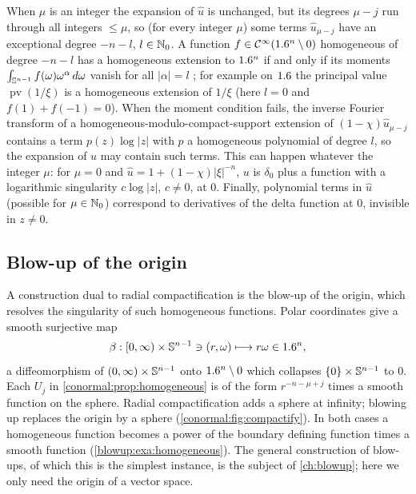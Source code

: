 When $\mu$ is an integer the expansion of $\hat u$ is unchanged, but its
degrees $\mu-j$ run through all integers $\le\mu$, so (for every integer
$\mu$) some terms $\hat u_{\mu-j}$ have an exceptional degree $-n-l$,
$l\in\mathbb{N}_0$. A function $f\in\mathcal{C}^\infty(1.6^n\setminus0)$ homogeneous of degree
$-n-l$ has a homogeneous extension to $1.6^n$ if and only if its moments
$\int_{\mathbb{S}^{n-1}}f(\omega)\omega^\alpha\,d\omega$ vanish for all
$|\alpha|=l$ \cite[Section~3.2]{Hormander-I}; for example on $1.6$ the
principal value $\operatorname{pv}(1/\xi)$ is a homogeneous extension of
$1/\xi$ (here $l=0$ and $f(1)+f(-1)=0$). When the moment condition fails,
the inverse Fourier transform of a homogeneous-modulo-compact-support
extension of $(1-\chi)\hat u_{\mu-j}$ contains a term $p(z)\log|z|$ with $p$
a homogeneous polynomial of degree $l$, so the expansion of $u$ may contain
such terms. This can happen whatever the integer $\mu$: for $\mu=0$ and
$\hat u=1+(1-\chi)|\xi|^{-n}$, $u$ is $\delta_0$ plus a function with a
logarithmic singularity $c\log|z|$, $c\ne0$, at $0$. Finally, polynomial terms
in $\hat u$ (possible for $\mu\in\mathbb{N}_0$) correspond to derivatives of the
delta function at $0$, invisible in $z\neq0$.

\subsection{Blow-up of the origin}
A construction dual to radial compactification is the blow-up of the origin,
which resolves the singularity of such homogeneous functions.  Polar coordinates
give a smooth surjective map
\begin{equation*}
  \beta:[0,\infty)\times\mathbb{S}^{n-1}\ni(r,\omega)\longmapsto r\omega\in1.6^n,
\end{equation*}
a diffeomorphism of $(0,\infty)\times\mathbb{S}^{n-1}$ onto $1.6^n\setminus0$ which
collapses $\{0\}\times\mathbb{S}^{n-1}$ to $0$.  Each $U_j$ in
\cref{conormal:prop:homogeneous} is of the form $r^{-n-\mu+j}$ times a smooth
function on the sphere.  Radial compactification adds a sphere at infinity;
blowing up replaces the origin by a sphere (\cref{conormal:fig:compactify}).
In both cases a homogeneous function becomes a power of the boundary defining
function times a smooth function (\cref{blowup:exa:homogeneous}).  The general
construction of blow-ups, of which this is the simplest instance, is the subject of
\cref{ch:blowup}; here we only need the origin of a vector space.

